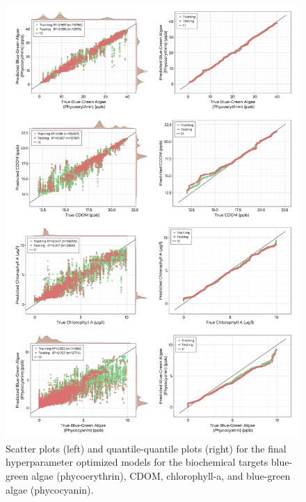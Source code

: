 \documentclass[remotesensing,article,submit,pdftex,moreauthors]{Definitions/mdpi}
\begin{document}
\begin{figure}
\centering
\includegraphics[width=\columnwidth]{paper/figures/results/fits/biochemical-fitres.png}
\caption{Scatter plots (left) and quantile-quantile plots (right) for the final hyperparameter optimized models for the biochemical targets blue-green algae (phycoerythrin), CDOM, chlorophyll-a, and blue-green algae (phycocyanin). \label{fig:biochem-fit}}
\end{figure}  
\end{document}
